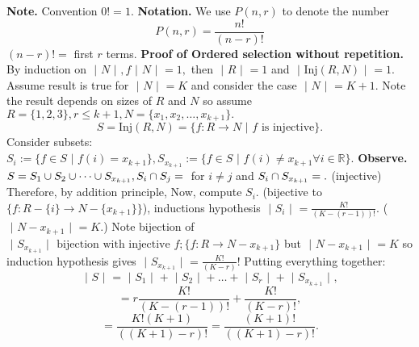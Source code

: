 \documentclass{article}
\begin{document}
\textbf{Note. } Convention $0! = 1.$
\newline
\newline
\textbf{Notation. } We use $P(n ,r)$ to denote the number 
$$P(n, r) = \frac{n!}{(n - r)!}$$ 
$(n - r)! = $ first $r$ terms.
\newline
\newline
\textbf{Proof of Ordered selection without repetition. }
\newline
By induction on $\text{ | } N \text{ | }, f\text{ | } N \text{ | } = 1, $ then $\text{ | } R \text{ | } = 1$ and $\text{ | } \text{Inj}(R, N) \text{ | } = 1.$
\newline
Assume result is true for $\text{ | } N \text{ | } = K$ and consider the case $\text{ | } N \text{ | } = K + 1.$
\newline
Note the result depends on sizes of $R$ and $N$ so assume $R = \{1, 2, 3\}, r \leq k + 1, N = \{ x_1, x_2, \dots, x_{k + 1}\}.$
\newline
\newline
$$S = \text{Inj}(R, N) = \{f: R \rightarrow N \text{ | } f \text{ is injective} \}.$$
\newline
\newline
Consider subsets: $S_i := \{ f \in S \text{ | } f(i) = x_{k + 1}\}, S_{x_{k + 1}} := \{ f \in S \text{ | } f(i) \not = x_{k + 1} \forall i \in \mathbb{R}\}.$
\newline
\newline
\textbf{Observe. } $S = S_1 \cup S_2 \cup \dots \cup S_{x_{k + 1}}, S_i \cap S_j = \null$ for $i \not = j$ and $S_i \cap S_{x_{k + 1}} = \null.$ (injective)
\newline
Therefore, by addition principle,
\newline
\newline
{}
\newline
\newline
Now, compute $S_i.$ (bijective to $\{ f: R - \{i \} \rightarrow N - \{x_{k + 1}\}\}$), inductions hypothesis $\text{ | } S_i \text{ | } = \frac{K!}{(K - (r - 1))!}$. ($\text{ | } N - x_{k + 1}\text{ | } = K.$)
\newline
\newline
Note bijection of $\text{ | } S_{x_{k + 1}} \text{ | } \text{ bijection with injective } f; \{ f: R \rightarrow N - x_{k + 1} \}$ but $\text{ | } N - x_{k + 1}\text{ | } = K$ so induction hypothesis gives $\text{ | } S_{x_{k + 1}} \text{ | } = \frac{K!}{(K - r)}!$
\newline
\newline
Putting everything together:
$$\text{ | } S \text{ | } = \text{ | } S_1 \text{ | } + \text{ | } S_2 \text{ | } + \dots + \text{ | } S_r \text{ | } + \text{ | } S_{x_{k + 1}}\text{ | },$$ 
$$ = r \frac{K!}{(K - (r - 1))!} + \frac{K!}{(K - r)!},$$ 
$$= \frac{K!(K + 1)}{((K + 1) - r)!} = \frac{(K + 1)!}{((K + 1) - r)!}.$$ 
\newpage
\end{document}
